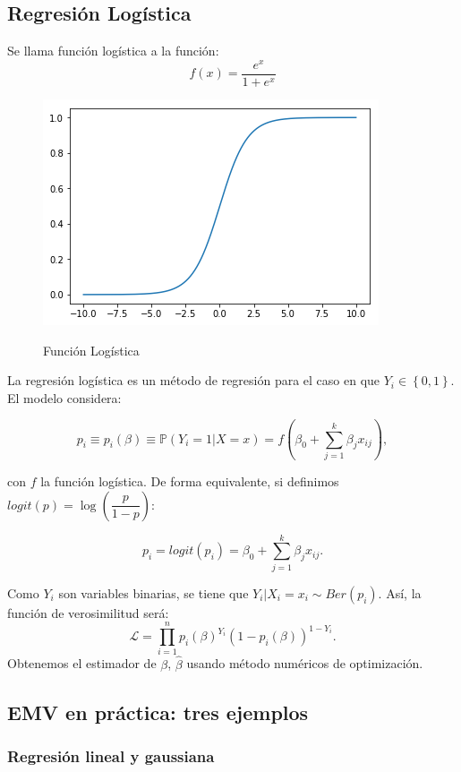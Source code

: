 \subsection{Regresión Logística}

\begin{definition}
Se llama función logística a la función: 
$$
f(x)=\dfrac{e^x}{1+e^x}
$$
\end{definition}
\begin{figure}[h]
    \centering
    \includegraphics[scale=0.65]{img/funcion_logistica.png}
    \label{fig:logistica}
    \caption{Función Logística}
\end{figure}
La regresión logística es un método de regresión para el caso en que $Y_i \in \left \{0,1 \right \}$. El modelo considera: 

$$
p_i \equiv p_i(\beta) \equiv \mathbb{P}(Y_i=1 | X=x)= f(\beta_0+\sum_{j=1}^{k}\beta_{j} x_{ij}),
$$ 

con $f$ la función logística. De forma equivalente, si definimos $logit(p)=\log(\dfrac{p}{1-p})$: 

$$
p_i=logit(p_i)= \beta_0+\sum_{j=1}^{k}\beta_j x_{ij}.
$$

Como $Y_i$ son variables binarias, se tiene que   $Y_i|X_i=x_i \sim Ber(p_i)$. Así, la función de verosimilitud será:
$$
\mathcal{L}=\prod_{i=1}^{n} p_i(\beta)^{Y_i}(1-p_i(\beta))^{1-Y_i}.
$$
Obtenemos el estimador de $\beta$, $\hat{\beta}$ usando método numéricos de optimización. 

\subsection{EMV en práctica: tres ejemplos}
\label{sub:MV_tres_ejemplos}

\subsubsection{Regresión lineal y gaussiana} 
\label{sub:reg_lin}



